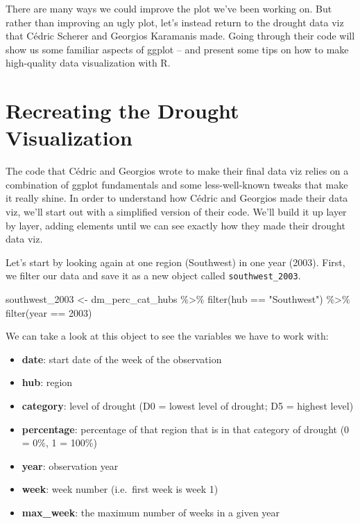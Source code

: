 \documentclass[
]{book}
\newenvironment{Shaded}{\begin{snugshade}}{\end{snugshade}}
\newcommand{\DecValTok}[1]{\textcolor[rgb]{0.00,0.00,0.81}{#1}}
\newcommand{\FunctionTok}[1]{\textcolor[rgb]{0.00,0.00,0.00}{#1}}
\newcommand{\NormalTok}[1]{#1}
\newcommand{\OtherTok}[1]{\textcolor[rgb]{0.56,0.35,0.01}{#1}}
\newcommand{\SpecialCharTok}[1]{\textcolor[rgb]{0.00,0.00,0.00}{#1}}
\newcommand{\StringTok}[1]{\textcolor[rgb]{0.31,0.60,0.02}{#1}}
\providecommand{\tightlist}{%
  \setlength{\itemsep}{0pt}\setlength{\parskip}{0pt}}
\begin{document}
There are many ways we could improve the plot we've been working on. But rather than improving an ugly plot, let's instead return to the drought data viz that Cédric Scherer and Georgios Karamanis made. Going through their code will show us some familiar aspects of ggplot -- and present some tips on how to make high-quality data visualization with R.

\hypertarget{recreating-the-drought-visualization}{%
\section{Recreating the Drought Visualization}\label{recreating-the-drought-visualization}}

The code that Cédric and Georgios wrote to make their final data viz relies on a combination of ggplot fundamentals and some less-well-known tweaks that make it really shine. In order to understand how Cédric and Georgios made their data viz, we'll start out with a simplified version of their code. We'll build it up layer by layer, adding elements until we can see exactly how they made their drought data viz.~

Let's start by looking again at one region (Southwest) in one year (2003). First, we filter our data and save it as a new object called \texttt{southwest\_2003}.

\begin{Shaded}
\begin{Highlighting}[]
\NormalTok{southwest\_2003 }\OtherTok{\textless{}{-}}\NormalTok{ dm\_perc\_cat\_hubs }\SpecialCharTok{\%\textgreater{}\%}
  \FunctionTok{filter}\NormalTok{(hub }\SpecialCharTok{==} \StringTok{"Southwest"}\NormalTok{) }\SpecialCharTok{\%\textgreater{}\%}
  \FunctionTok{filter}\NormalTok{(year }\SpecialCharTok{==} \DecValTok{2003}\NormalTok{)}
\end{Highlighting}
\end{Shaded}

We can take a look at this object to see the variables we have to work with:

\begin{itemize}
\tightlist
\item
  \textbf{date}: start date of the week of the observation
\item
  \textbf{hub}: region
\item
  \textbf{category}: level of drought (D0 = lowest level of drought; D5 = highest level)
\item
  \textbf{percentage}: percentage of that region that is in that category of drought (0 = 0\%, 1 = 100\%)
\item
  \textbf{year}: observation year
\item
  \textbf{week}: week number (i.e.~first week is week 1)
\item
  \textbf{max\_week}: the maximum number of weeks in a given year
\end{itemize}
\end{document}
